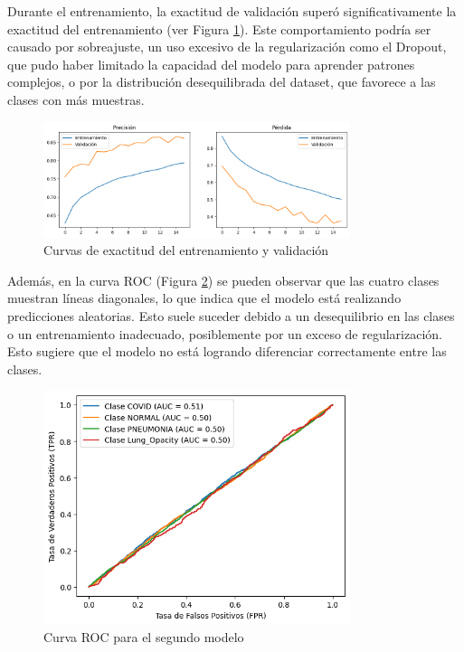 \documentclass{article}
\begin{document}
	
	
	Durante el entrenamiento, la exactitud de validación superó significativamente la exactitud del entrenamiento (ver Figura \ref{fig:accuracy_curves}). Este comportamiento podría ser causado por sobreajuste, un uso excesivo de la regularización como el Dropout, que pudo haber limitado la capacidad del modelo para aprender patrones complejos, o por la distribución desequilibrada del dataset, que favorece a las clases con más muestras.
	\\
	\begin{figure}[h!]
		\centering
		\includegraphics[width=0.8\textwidth]{images/entrenovalidacion1.png}
		\caption{Curvas de exactitud del entrenamiento y validación}
		\label{fig:accuracy_curves}
	\end{figure}

Además, en la curva ROC (Figura \ref{fig:roc1}) se pueden observar que las cuatro clases muestran líneas diagonales, lo que indica que el modelo está realizando predicciones aleatorias. Esto suele suceder debido a un desequilibrio en las clases o un entrenamiento inadecuado, posiblemente por un exceso de regularización. Esto sugiere que el modelo no está logrando diferenciar correctamente entre las clases.

\begin{figure}[h!]
	\centering
	\includegraphics[width=0.8\textwidth]{images/roc1.png}
	\caption{Curva ROC para el segundo modelo}
	\label{fig:roc1}
\end{figure}
	
\end{document}
